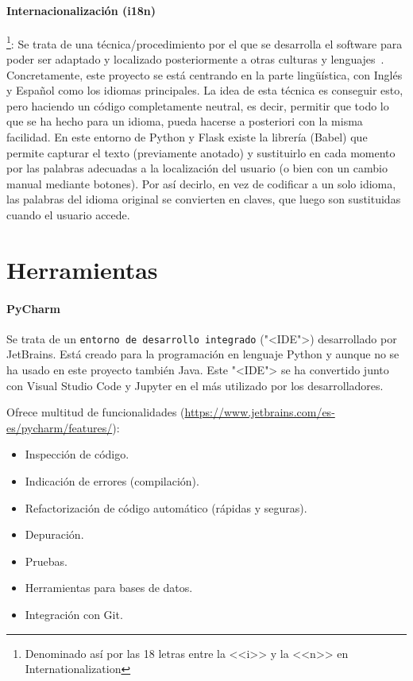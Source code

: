 \paragraph{Internacionalización (i18n)}\footnote{Denominado así por las 18 letras
entre la <<i>> y la <<n>> en Internationalization}: Se trata de una
técnica/procedimiento por el que se desarrolla el software para poder ser
adaptado y localizado posteriormente a otras culturas y
lenguajes~\cite{lokalise}. Concretamente, este proyecto se está centrando en la
parte lingüística, con Inglés y Español como los idiomas principales. La idea de
esta técnica es conseguir esto, pero haciendo un código completamente neutral,
es decir, permitir que todo lo que se ha hecho para un idioma, pueda hacerse a
posteriori con la misma facilidad. En este entorno de Python y Flask existe la
librería (Babel) que permite capturar el texto (previamente anotado) y
sustituirlo en cada momento por las palabras adecuadas a la localización del
usuario (o bien con un cambio manual mediante botones). Por así decirlo, en vez
de codificar a un solo idioma, las palabras del idioma original se convierten en
claves, que luego son sustituidas cuando el usuario accede.


\section{Herramientas}

\paragraph{PyCharm}
Se trata de un \texttt{entorno de desarrollo integrado} ("<IDE">) desarrollado
por JetBrains. Está creado para la programación en lenguaje Python y aunque no
se ha usado en este proyecto también Java. Este "<IDE"> se ha convertido junto
con Visual Studio Code y Jupyter en el más utilizado por los desarrolladores.

Ofrece multitud de funcionalidades
(\url{https://www.jetbrains.com/es-es/pycharm/features/}):
\begin{itemize}
	\item Inspección de código.
	\item Indicación de errores (compilación).
	\item Refactorización de código automático (rápidas y seguras).
	\item Depuración.
	\item Pruebas.
	\item Herramientas para bases de datos.
	\item Integración con Git.
\end{itemize}

